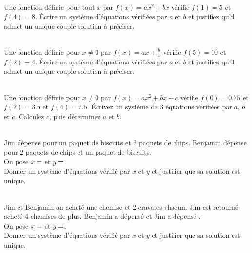 \documentclass[main.tex]{subfiles}
\begin{document}
\begin{exercise} \hfill \\
Une fonction définie pour  tout $x$ par  $f(x)=ax^2+bx$  vérifie $f(1)=5$ et $f(4)=8$. Écrire un système d'équations vérifiées par $a$ et $b$  et justifiez qu'il admet un unique couple solution à préciser.
\end{exercise}
\begin{exercise} \hfill \\
	Une fonction définie pour $x\neq 0$ par  $f(x)=ax+\tfrac{b}{x}$  vérifie $f(5)=10$ et $f(2)=4$. Écrire un système d'équations vérifiées par $a$ et $b$  et justifiez qu'il admet un unique couple solution à préciser.
\end{exercise}
\begin{exercise} \hfill \\
Une fonction définie pour $x\neq 0$ par  $f(x)=ax^2+bx+c$  vérifie $f(0)=0.75$ et $f(2)=3.5$ et $f(4)=7.5$. Écrivez un système de 3 équations vérifiées par $a$, $b$ et $c$. Calculez $c$, puis déterminez $a$ et $b$.
\end{exercise}
\begin{exercise} \hfill \\
Jim dépense  pour un paquet de biscuits et 3 paquets de chips. Benjamin dépense  pour 2 paquets de chips et un paquet de biscuits.\\
	On pose $x= \dotfill $ et $y= \dotfill$.\\
Donner un système d'équations vérifié par $x$ et $y$ et justifier que sa solution est unique.
\end{exercise}
\begin{exercise} \hfill \\
Jim et Benjamin on acheté une chemise et 2 cravates chacun. Jim est retourné acheté 4 chemises de plus. Benjamin a dépensé  et Jim a dépensé .\\
	On pose $x= \dotfill $ et $y= \dotfill$.\\
	Donner un système d'équations vérifié par $x$ et $y$ et justifier que sa solution est unique.
\end{exercise}
\end{document}
